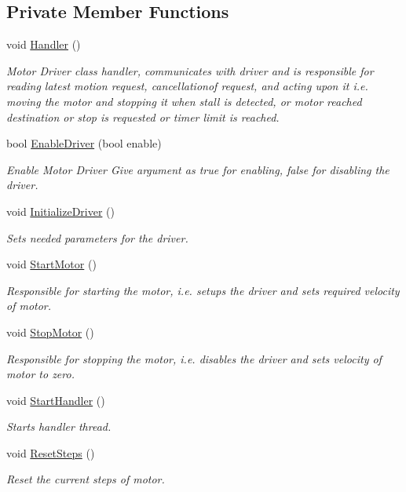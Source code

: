 \subsection*{Private Member Functions}
\begin{DoxyCompactItemize}
\item 
void \hyperlink{classMotorDriver_a1eee734aa12c1565d6ae629924962115}{Handler} ()
\begin{DoxyCompactList}\small\item\em Motor Driver class handler, communicates with driver and is responsible for reading latest motion request, cancellationof request, and acting upon it i.\+e. moving the motor and stopping it when stall is detected, or motor reached destination or stop is requested or timer limit is reached. \end{DoxyCompactList}\item 
bool \hyperlink{classMotorDriver_a754252fe0d18118e074cbdc1fe42da57}{Enable\+Driver} (bool enable)
\begin{DoxyCompactList}\small\item\em Enable Motor Driver Give argument as true for enabling, false for disabling the driver. \end{DoxyCompactList}\item 
void \hyperlink{classMotorDriver_a9151c6649515b7ff61dc6159456ffa80}{Initialize\+Driver} ()
\begin{DoxyCompactList}\small\item\em Sets needed parameters for the driver. \end{DoxyCompactList}\item 
void \hyperlink{classMotorDriver_a5ebab90ca98fa04463de1cbae76af994}{Start\+Motor} ()
\begin{DoxyCompactList}\small\item\em Responsible for starting the motor, i.\+e. setups the driver and sets required velocity of motor. \end{DoxyCompactList}\item 
void \hyperlink{classMotorDriver_aff8659e64841fb4b97c23b3494cd0575}{Stop\+Motor} ()
\begin{DoxyCompactList}\small\item\em Responsible for stopping the motor, i.\+e. disables the driver and sets velocity of motor to zero. \end{DoxyCompactList}\item 
void \hyperlink{classMotorDriver_a64827491330490668bb8f8e57d0f3942}{Start\+Handler} ()
\begin{DoxyCompactList}\small\item\em Starts handler thread. \end{DoxyCompactList}\item 
void \hyperlink{classMotorDriver_a19833e114feff56c3a7d1d032a455e0a}{Reset\+Steps} ()
\begin{DoxyCompactList}\small\item\em Reset the current steps of motor. \end{DoxyCompactList}\end{DoxyCompactItemize}
